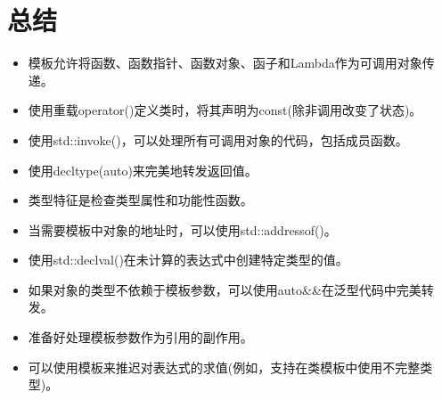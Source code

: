 \section{总结}

\begin{itemize}
\item 
模板允许将函数、函数指针、函数对象、函子和Lambda作为可调用对象传递。

\item 
使用重载operator()定义类时，将其声明为const(除非调用改变了状态)。

\item 
使用std::invoke()，可以处理所有可调用对象的代码，包括成员函数。

\item 
使用decltype(auto)来完美地转发返回值。

\item 
类型特征是检查类型属性和功能性函数。

\item 
当需要模板中对象的地址时，可以使用std::addressof()。

\item 
使用std::declval()在未计算的表达式中创建特定类型的值。

\item 
如果对象的类型不依赖于模板参数，可以使用auto\&\&在泛型代码中完美转发。

\item 
准备好处理模板参数作为引用的副作用。

\item 
可以使用模板来推迟对表达式的求值(例如，支持在类模板中使用不完整类型)。
\end{itemize}